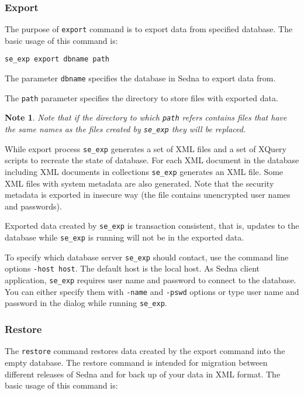 \documentclass[a4paper,12pt]{article}
\newtheorem{note}{Note}
\begin{document}
\subsubsection*{Export}
The purpose of \verb!export! command is to export data from specified database. The basic usage
of this command is:

\begin{verbatim}
se_exp export dbname path
\end{verbatim}

The parameter \verb!dbname! specifies the database in Sedna to export data from.

The \verb!path! parameter specifies the directory to store files with exported data.

\begin{note}
Note that if the directory to which \verb!path! refers contains files that have the same names as the files created by \verb!se_exp! they will be replaced.
\end{note}

While export process \verb!se_exp! generates a set of XML files and a set of XQuery scripts to
recreate the state of database. For each XML document in the database including XML documents in
collections \verb!se_exp! generates an XML file. Some XML files with system metadata are also
generated. Note that the security metadata is exported in insecure way (the file contains
unencrypted user names and passwords).

Exported data created by \verb!se_exp! is transaction consistent, that is, updates to the database
while \verb!se_exp! is running will not be in the exported data.

To specify which database server \verb!se_exp! should contact, use the command line options
\verb!-host host!. The default host is the local host. As Sedna client application, \verb!se_exp!
requires user name and password to connect to the database. You can either specify them with
\verb!-name! and \verb!-pswd! options or type user name and password in the dialog while
running \verb!se_exp!.




\subsubsection*{Restore}

The \verb!restore! command restores data created by the export command into the empty database.
The restore command is intended for migration between different releases of Sedna and for back
up of your data in XML format. The basic usage of this command is:
\end{document}
